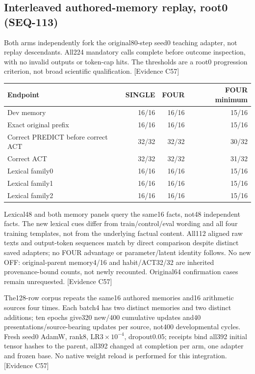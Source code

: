 \documentclass[11pt]{article}
\newcommand{\ev}[1]{\textsf{[Evidence #1]}}
\begin{document}
\subsection{Interleaved authored-memory replay, root0 (SEQ-113)}
Both arms independently fork the original80-step seed0 teaching adapter, not
replay descendants. All224 mandatory calls complete before outcome inspection,
with no invalid outputs or token-cap hits. The thresholds are a root0 progression
criterion, not broad scientific qualification. \ev{C57}

\begin{center}
\begin{tabular}{lrrr}
\toprule
Endpoint & SINGLE & FOUR & FOUR minimum \\
\midrule
Dev memory & 16/16 & 16/16 & 15/16 \\
Exact original prefix & 16/16 & 16/16 & 15/16 \\
Correct PREDICT before correct ACT & 32/32 & 32/32 & 30/32 \\
Correct ACT & 32/32 & 32/32 & 31/32 \\
Lexical family0 & 16/16 & 16/16 & 15/16 \\
Lexical family1 & 16/16 & 16/16 & 15/16 \\
Lexical family2 & 16/16 & 16/16 & 15/16 \\
\bottomrule
\end{tabular}
\end{center}

Lexical48 and both memory panels query the same16 facts, not48 independent facts.
The new lexical cues differ from train/control/eval wording and all four training
templates, not from the underlying factual content. All112 aligned raw texts and
output-token sequences match by direct comparison despite distinct saved adapters;
no FOUR advantage or parameter/latent identity follows. No new OFF: original-parent
memory4/16 and habit/ACT32/32 are inherited provenance-bound counts, not newly
recounted. Original64 confirmation cases remain unrequested. \ev{C57}

The128-row corpus repeats the same16 authored memories and16 arithmetic sources
four times. Each batch4 has two distinct memories and two distinct additions;
ten epochs give320 new/400 cumulative updates and40 presentations/source-bearing
updates per source, not400 developmental cycles. Fresh seed0 AdamW, rank8,
LR$3\times10^{-4}$, dropout0.05; receipts bind all392 initial tensor hashes to
the parent, all392 changed at completion per arm, one adapter and frozen base.
No native weight reload is performed for this integration. \ev{C57}
\end{document}
